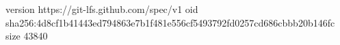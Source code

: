 version https://git-lfs.github.com/spec/v1
oid sha256:4d8cf1b41443ed794863e7b1f481e556cf5493792fd0257cd686cbbb20b146fc
size 43840
